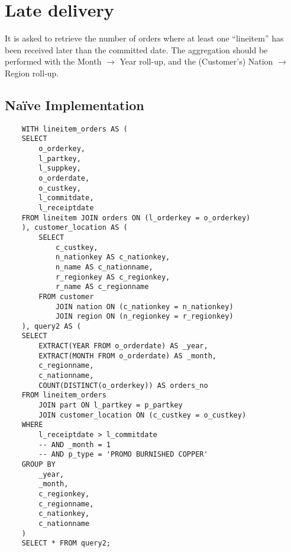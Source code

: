 

\section{Late delivery}

It is asked to retrieve the number of orders where at least one ``lineitem'' has been received later than the committed date.
The aggregation should be performed with the Month $\rightarrow$ Year roll-up, and the (Customer's) Nation $\rightarrow$ Region roll-up.

\subsection{Na\"{i}ve Implementation}

\begin{lstlisting}
    WITH lineitem_orders AS (
	SELECT
		o_orderkey, 
		l_partkey, 
		l_suppkey, 
		o_orderdate, 
		o_custkey,
		l_commitdate,
		l_receiptdate
	FROM lineitem JOIN orders ON (l_orderkey = o_orderkey)
    ), customer_location AS (
        SELECT 
            c_custkey, 
            n_nationkey AS c_nationkey, 
            n_name AS c_nationname, 
            r_regionkey AS c_regionkey, 
            r_name AS c_regionname 
        FROM customer 
            JOIN nation ON (c_nationkey = n_nationkey)
            JOIN region ON (n_regionkey = r_regionkey)
    ), query2 AS (
    SELECT 
        EXTRACT(YEAR FROM o_orderdate) AS _year,
        EXTRACT(MONTH FROM o_orderdate) AS _month,
        c_regionname,
        c_nationname,
        COUNT(DISTINCT(o_orderkey)) AS orders_no
    FROM lineitem_orders
        JOIN part ON l_partkey = p_partkey
        JOIN customer_location ON (c_custkey = o_custkey)
    WHERE 
        l_receiptdate > l_commitdate
        -- AND _month = 1
        -- AND p_type = 'PROMO BURNISHED COPPER'
    GROUP BY
        _year,
        _month,
        c_regionkey,
        c_regionname,
        c_nationkey,
        c_nationname
    )
    SELECT * FROM query2;
\end{lstlisting}